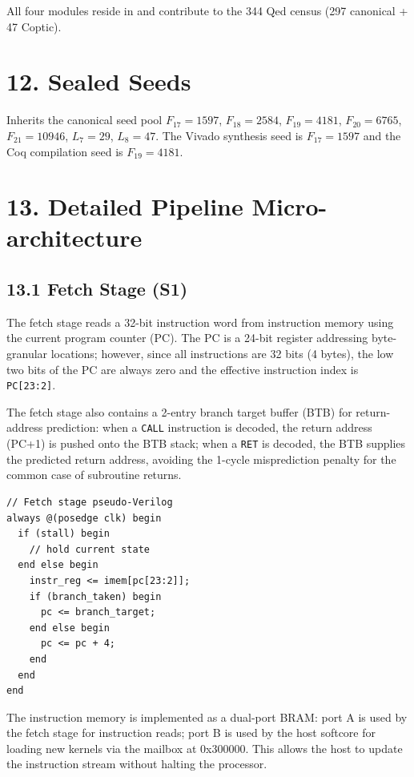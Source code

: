 All four modules reside in
 and contribute to the 344
Qed census (297 canonical + 47 Coptic).

\section{12. Sealed Seeds}\label{fa_71:sealed-seeds}

Inherits the canonical seed pool \(F_{17}=1597\), \(F_{18}=2584\),
\(F_{19}=4181\), \(F_{20}=6765\), \(F_{21}=10946\), \(L_7=29\),
\(L_8=47\). The Vivado synthesis seed is \(F_{17}=1597\) and
the Coq compilation seed is \(F_{19}=4181\).

\section{13. Detailed Pipeline Micro-architecture}\label{fa_71:pipeline-micro}

\subsection{13.1 Fetch Stage (S1)}\label{fa_71:fetch}

The fetch stage reads a 32-bit instruction word from instruction
memory using the current program counter (PC). The PC is a 24-bit
register addressing byte-granular locations; however, since all
instructions are 32 bits (4 bytes), the low two bits of the PC
are always zero and the effective instruction index is
\texttt{PC[23:2]}.

The fetch stage also contains a 2-entry branch target buffer (BTB)
for return-address prediction: when a \texttt{CALL} instruction
is decoded, the return address (PC+1) is pushed onto the BTB
stack; when a \texttt{RET} is decoded, the BTB supplies the
predicted return address, avoiding the 1-cycle misprediction
penalty for the common case of subroutine returns.

\begin{verbatim}
// Fetch stage pseudo-Verilog
always @(posedge clk) begin
  if (stall) begin
    // hold current state
  end else begin
    instr_reg <= imem[pc[23:2]];
    if (branch_taken) begin
      pc <= branch_target;
    end else begin
      pc <= pc + 4;
    end
  end
end
\end{verbatim}

The instruction memory is implemented as a dual-port BRAM: port A
is used by the fetch stage for instruction reads; port B is used
by the host softcore for loading new kernels via the mailbox at
0x300000. This allows the host to update the instruction stream
without halting the processor.

